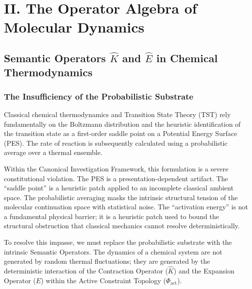 \documentclass[11pt,openany]{extbook}
\theoremstyle{plain}
\theoremstyle{definition}
\begin{document}
\part{II. The Operator Algebra of Molecular Dynamics}

\chapter{Semantic Operators $\hat{K}$ and $\hat{E}$ in Chemical Thermodynamics}

\section{The Insufficiency of the Probabilistic Substrate}

Classical chemical thermodynamics and Transition State Theory (TST) rely fundamentally on the Boltzmann distribution and the heuristic identification of the transition state as a first-order saddle point on a Potential Energy Surface (PES). The rate of reaction is subsequently calculated using a probabilistic average over a thermal ensemble.

Within the Canonical Investigation Framework, this formulation is a severe constitutional violation. The PES is a presentation-dependent artifact. The ``saddle point'' is a heuristic patch applied to an incomplete classical ambient space. The probabilistic averaging masks the intrinsic structural tension of the molecular continuation space with statistical noise. The ``activation energy'' is not a fundamental physical barrier; it is a heuristic patch used to bound the structural obstruction that classical mechanics cannot resolve deterministically.

To resolve this impasse, we must replace the probabilistic substrate with the intrinsic Semantic Operators. The dynamics of a chemical system are not generated by random thermal fluctuations; they are generated by the deterministic interaction of the Contraction Operator ($\hat{K}$) and the Expansion Operator ($\hat{E}$) within the Active Constraint Topology ($\Phi_{\text{act}}$).
\end{document}
